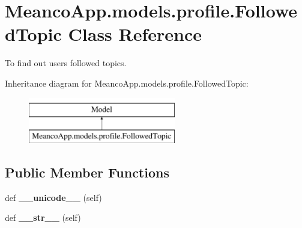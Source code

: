 \hypertarget{class_meanco_app_1_1models_1_1profile_1_1_followed_topic}{}\section{Meanco\+App.\+models.\+profile.\+Followed\+Topic Class Reference}
\label{class_meanco_app_1_1models_1_1profile_1_1_followed_topic}


To find out users followed topics.  


Inheritance diagram for Meanco\+App.\+models.\+profile.\+Followed\+Topic\+:\begin{figure}[H]
\begin{center}
\leavevmode
\includegraphics[height=2.000000cm]{class_meanco_app_1_1models_1_1profile_1_1_followed_topic}
\end{center}
\end{figure}
\subsection*{Public Member Functions}
\begin{DoxyCompactItemize}
\item 
\hypertarget{class_meanco_app_1_1models_1_1profile_1_1_followed_topic_aab2050cd38394f2b70e2460bc1cfc037}{}\label{class_meanco_app_1_1models_1_1profile_1_1_followed_topic_aab2050cd38394f2b70e2460bc1cfc037} 
def {\bfseries \+\_\+\+\_\+unicode\+\_\+\+\_\+} (self)
\item 
\hypertarget{class_meanco_app_1_1models_1_1profile_1_1_followed_topic_a99854909d6f35ed1b2045664b7ba5fb0}{}\label{class_meanco_app_1_1models_1_1profile_1_1_followed_topic_a99854909d6f35ed1b2045664b7ba5fb0} 
def {\bfseries \+\_\+\+\_\+str\+\_\+\+\_\+} (self)
\end{DoxyCompactItemize}

